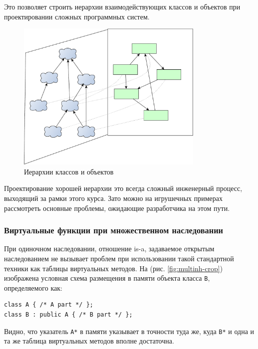 \documentclass[a4paper,12pt,oneside]{article}
\begin{document}
Это позволяет строить иерархии взаимодействующих классов и объектов при проектировании сложных программных систем.

\begin{figure}[h!]
\centering
\includegraphics[width=0.8\textwidth]{illustrations/hierarchies-crop.pdf}
\caption{Иерархии классов и объектов}
\label{fig:hierarchies-crop}
\end{figure}

Проектирование хорошей иерархии это всегда сложный инженерный процесс, выходящий за рамки этого курса. Зато можно на игрушечных примерах рассмотреть основные проблемы, ожидающие разработчика на этом пути.

\subsubsection{Виртуальные функции при множественном наследовании}\label{VirtThunks}

При одиночном наследовании, отношение is-a, задаваемое открытым наследованием не вызывает проблем при использовании такой стандартной техники как таблицы виртуальных методов. На (рис. \ref{fig:multinh-crop}) изображена условная схема размещения в памяти объекта класса \lstinline!B!, определяемого как:

\begin{lstlisting}
class A { /* A part */ };
class B : public A { /* B part */ };
\end{lstlisting}

Видно, что указатель \lstinline!A*! в памяти указывает в точности туда же, куда \lstinline!B*! и одна и та же таблица виртуальных методов вполне достаточна.
\end{document}
